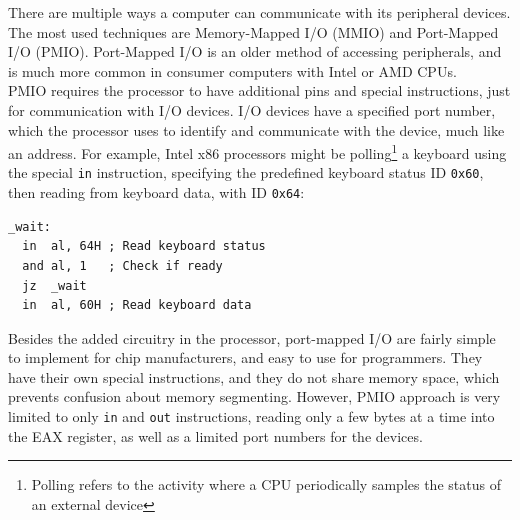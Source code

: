 \label{sec:io}
There are multiple ways a computer can communicate with its peripheral devices.
The most used techniques are Memory-Mapped I/O (MMIO) and Port-Mapped I/O
(PMIO). Port-Mapped I/O is an older method of accessing peripherals, and is much
more common in consumer computers with Intel or AMD CPUs\cite{intelmanual}.\\
PMIO requires the processor to have additional pins and special instructions,
just for communication with I/O devices. I/O devices have a specified port
number, which the processor uses to identify and communicate with the device,
much like an address.
For example, Intel x86 processors might be polling\footnote{Polling refers to
the activity where a CPU periodically samples the status of an external device}
a keyboard using the special \texttt{in} instruction, specifying the predefined
keyboard status ID \texttt{0x60}, then reading from keyboard data, with ID
\texttt{0x64}\cite{intel:pch}\cite{osdev:io_ports}:
\begin{lstlisting}[language={[x86masm]Assembler}]
_wait:
  in  al, 64H ; Read keyboard status
  and al, 1   ; Check if ready
  jz  _wait
  in  al, 60H ; Read keyboard data
\end{lstlisting}
Besides the added circuitry in the processor, port-mapped I/O are fairly
simple to implement for chip manufacturers, and easy to use for programmers.
They have their own special instructions,
and they do not share memory space, which prevents confusion about
memory segmenting.
However, PMIO approach is very limited to only \texttt{in} and \texttt{out}
instructions, reading only a few bytes at a time into the EAX register, as well
as a limited port numbers for the devices.\cite{intelmanual}\\


